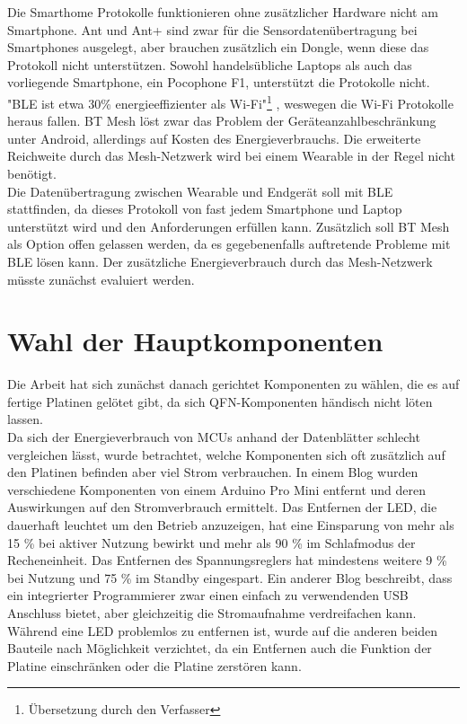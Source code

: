 Die Smarthome Protokolle funktionieren ohne zusätzlicher Hardware nicht am Smartphone.
Ant und Ant+ sind zwar für die Sensordatenübertragung bei Smartphones ausgelegt, aber brauchen zusätzlich ein Dongle, wenn diese das Protokoll nicht unterstützen.
Sowohl handelsübliche Laptops als auch das vorliegende Smartphone, ein Pocophone F1, unterstützt die Protokolle nicht.\\
"BLE ist etwa 30\% energieeffizienter als Wi-Fi"\footnote{Übersetzung durch den Verfasser} \cite{comparison_wifi_ble}, weswegen die Wi-Fi Protokolle heraus fallen.
BT Mesh löst zwar das Problem der Geräteanzahlbeschränkung unter Android, allerdings auf Kosten des Energieverbrauchs.
Die erweiterte Reichweite durch das Mesh-Netzwerk wird bei einem Wearable in der Regel nicht benötigt.\\
Die Datenübertragung zwischen Wearable und Endgerät soll mit BLE stattfinden, da dieses Protokoll von fast jedem Smartphone und Laptop unterstützt wird und den Anforderungen erfüllen kann.
Zusätzlich soll BT Mesh als Option offen gelassen werden, da es gegebenenfalls auftretende Probleme mit BLE lösen kann.
Der zusätzliche Energieverbrauch durch das Mesh-Netzwerk müsste zunächst evaluiert werden.

\section{Wahl der Hauptkomponenten}
Die Arbeit hat sich zunächst danach gerichtet Komponenten zu wählen, die es auf fertige Platinen gelötet gibt, da sich QFN-Komponenten händisch nicht löten lassen.\\
Da sich der Energieverbrauch von MCUs anhand der Datenblätter schlecht vergleichen lässt, wurde betrachtet, welche Komponenten sich oft zusätzlich auf den Platinen befinden aber viel Strom verbrauchen.
In einem Blog \cite{site_arduinolp} wurden verschiedene Komponenten von einem Arduino Pro Mini entfernt und deren Auswirkungen auf den Stromverbrauch ermittelt.
Das Entfernen der LED, die dauerhaft leuchtet um den Betrieb anzuzeigen, hat eine Einsparung von mehr als 15 \% bei aktiver Nutzung bewirkt und mehr als 90 \% im Schlafmodus der Recheneinheit.
Das Entfernen des Spannungsreglers hat mindestens weitere 9 \% bei Nutzung und 75 \% im Standby eingespart.
Ein anderer Blog \cite{site_arduinolp2} beschreibt, dass ein integrierter Programmierer zwar einen einfach zu verwendenden USB Anschluss bietet, aber gleichzeitig die Stromaufnahme verdreifachen kann.
Während eine LED problemlos zu entfernen ist, wurde auf die anderen beiden Bauteile nach Möglichkeit verzichtet, da ein Entfernen auch die Funktion der Platine einschränken oder die Platine zerstören kann.

